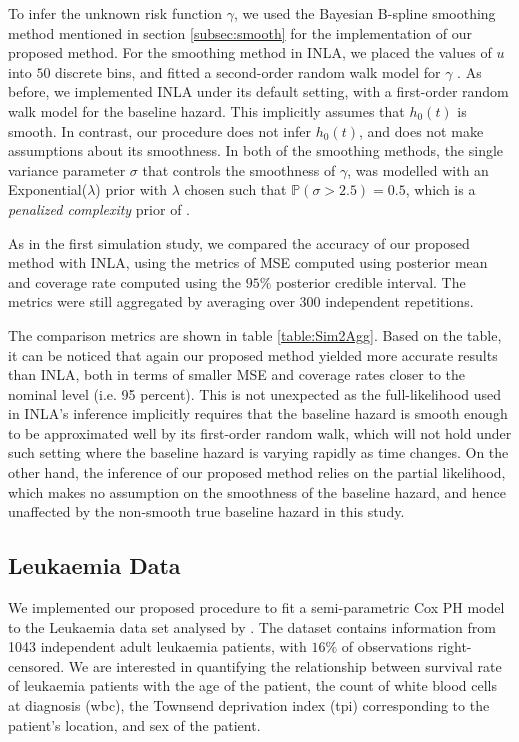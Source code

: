 \documentclass[ba]{imsart}
\begin{document}
To infer the unknown risk function $\gamma$, we used the Bayesian B-spline smoothing method mentioned in section \ref{subsec:smooth} for the implementation of our proposed method. For the smoothing method in INLA, we placed the values of $u$ into $50$ discrete bins, and fitted a second-order random walk model for $\gamma$ \citep{rw2}. As before, we implemented INLA under its default setting, with a first-order random walk model for the baseline hazard. This implicitly assumes that $h_{0}(t)$ is smooth. In contrast, our procedure does not infer $h_{0}(t)$, and does not make assumptions about its smoothness. In both of the smoothing methods, the single variance parameter $\sigma$ that controls the smoothness of $\gamma$, was modelled with an Exponential($\lambda$) prior with $\lambda$ chosen such that $\mathbb{P}\left( \sigma > 2.5\right) = 0.5$, which is a \emph{penalized complexity} prior of \cite{pcprior}.

As in the first simulation study, we compared the accuracy of our proposed method with INLA, using the metrics of MSE computed using posterior mean and coverage rate computed using the $95\%$ posterior credible interval. The metrics were still aggregated by averaging over 300 independent repetitions.

The comparison metrics are shown in table \ref{table:Sim2Agg}. Based on the table, it can be noticed that again our proposed method yielded more accurate results than INLA, both in terms of smaller MSE and coverage rates closer to the nominal level (i.e. 95 percent). This is not unexpected as the full-likelihood used in INLA's inference implicitly requires that the baseline hazard is smooth enough to be approximated well by its first-order random walk, which will not hold under such setting where the baseline hazard is varying rapidly as time changes. On the other hand, the inference of our proposed method relies on the partial likelihood, which makes no assumption on the smoothness of the baseline hazard, and hence unaffected by the non-smooth true baseline hazard in this study.

\subsection{Leukaemia Data}\label{subsec:leuk}

We implemented our proposed procedure to fit a semi-parametric Cox PH model to the Leukaemia data set analysed by \cite{inlacoxph}. The dataset contains information from 1043 independent adult leukaemia patients, with $16\%$ of observations right-censored. We are interested in quantifying the relationship between survival rate of leukaemia patients with the age of the patient, the count of white blood cells at diagnosis (wbc), the Townsend deprivation index (tpi) corresponding to the patient's location, and sex of the patient.
\end{document}
